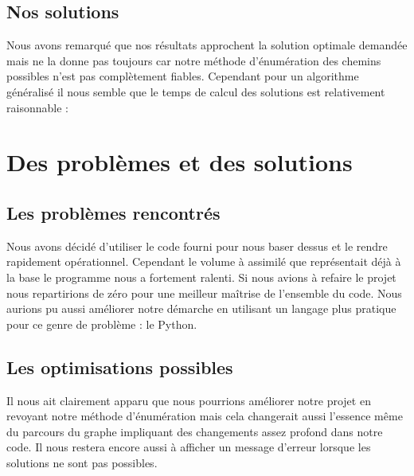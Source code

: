 \documentclass[french]{article}
\begin{document}
	
	\subsection{Nos solutions}
	Nous avons remarqué que nos résultats approchent la solution optimale demandée mais ne la donne pas toujours car notre méthode d'énumération des chemins possibles n'est pas complètement fiables. Cependant pour un algorithme généralisé il nous semble que le temps de calcul des solutions est relativement raisonnable :

	
\section{Des problèmes et des solutions}
	\subsection{Les problèmes rencontrés}
	Nous avons décidé d'utiliser le code fourni pour nous baser dessus et le rendre rapidement opérationnel. Cependant le volume à assimilé que représentait déjà à la base le programme nous a fortement ralenti. Si nous avions à refaire le projet nous repartirions de zéro pour une meilleur maîtrise de l'ensemble du code.
	Nous aurions pu aussi améliorer notre démarche en utilisant un langage plus pratique pour ce genre de problème : le Python.
	
	\subsection{Les optimisations possibles}
	Il nous ait clairement apparu que nous pourrions améliorer notre projet en revoyant notre méthode d'énumération mais cela changerait aussi l'essence même du parcours du graphe impliquant des changements assez profond dans notre code.
	Il nous restera encore aussi à afficher un message d'erreur lorsque les solutions ne sont pas possibles.
\end{document}
